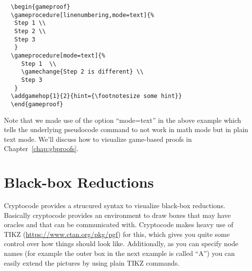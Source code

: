 \documentclass[a4paper]{report}
\begin{document}
  \vspace{2\baselineskip}
  \begin{center}
  \begin{gameproof}
  \end{gameproof}
  \end{center}
  \begin{lstlisting}
  \begin{gameproof}
  \gameprocedure[linenumbering,mode=text]{%
   Step 1 \\
   Step 2 \\
   Step 3  
   }
  \gameprocedure[mode=text]{%
	 Step 1  \\
	 \gamechange{Step 2 is different} \\
	 Step 3
   }
  \addgamehop{1}{2}{hint={\footnotesize some hint}}
  \end{gameproof}
  \end{lstlisting}
  Note that we made use of the option \enquote{mode=text} in the above example which tells the underlying pseudocode 
  command to not work in math mode but in plain text mode. We'll discuss how to visualize game-based proofs in Chapter~\ref{chap:gbproofs}.
  
  \section{Black-box Reductions}
  Cryptocode provides a strucured syntax to visualize black-box reductions. Basically cryptocode
  provides an environment to draw boxes that may have oracles and that can be communicated with.
  Cryptocode makes heavy use of TIKZ (\url{https://www.ctan.org/pkg/pgf}) for this, which gives you 
  quite some control over how things should look like. Additionally, as you can specify node names
  (for example the outer box in the next example is called \enquote{A}) you can easily extend the pictures
  by using plain TIKZ commands.
  
\end{document}
